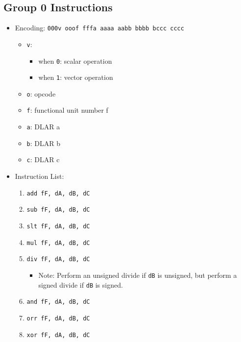 \documentclass{article}
\begin{document}
	\subsection{Group 0 Instructions}
		\begin{itemize}
		\item Encoding:  \texttt{000v ooof fffa aaaa  aabb bbbb bccc cccc}
			\begin{itemize}
			\item \texttt{v}:
				\begin{itemize}
				\item when \texttt{0}:  scalar operation
				\item when \texttt{1}:  vector operation
				\end{itemize}
			\item \texttt{o}:  opcode
			\item \texttt{f}:  functional unit number f
			\item \texttt{a}:  DLAR a
			\item \texttt{b}:  DLAR b
			\item \texttt{c}:  DLAR c
			\end{itemize}
		\item Instruction List:
			\begin{enumerate}
			\item \texttt{add fF, dA, dB, dC}
			\item \texttt{sub fF, dA, dB, dC}
			\item \texttt{slt fF, dA, dB, dC}
			\item \texttt{mul fF, dA, dB, dC}

			\item \texttt{div fF, dA, dB, dC}
				\begin{itemize}
				\item Note:  Perform an unsigned divide if \texttt{dB} is
					unsigned, but perform a signed divide if \texttt{dB} is
					signed.
				\end{itemize}
			\item \texttt{and fF, dA, dB, dC}
			\item \texttt{orr fF, dA, dB, dC}
			\item \texttt{xor fF, dA, dB, dC}
			\end{enumerate}
		\end{itemize}
\end{document}
